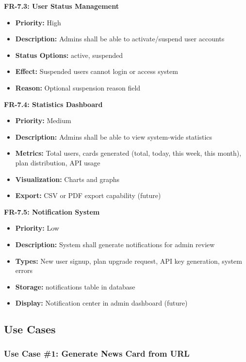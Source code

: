 \documentclass[12pt,a4paper]{article}
\begin{document}
\textbf{FR-7.3: User Status Management}
\begin{itemize}
    \item \textbf{Priority:} High
    \item \textbf{Description:} Admins shall be able to activate/suspend user accounts
    \item \textbf{Status Options:} active, suspended
    \item \textbf{Effect:} Suspended users cannot login or access system
    \item \textbf{Reason:} Optional suspension reason field
\end{itemize}

\textbf{FR-7.4: Statistics Dashboard}
\begin{itemize}
    \item \textbf{Priority:} Medium
    \item \textbf{Description:} Admins shall be able to view system-wide statistics
    \item \textbf{Metrics:} Total users, cards generated (total, today, this week, this month), plan distribution, API usage
    \item \textbf{Visualization:} Charts and graphs
    \item \textbf{Export:} CSV or PDF export capability (future)
\end{itemize}

\textbf{FR-7.5: Notification System}
\begin{itemize}
    \item \textbf{Priority:} Low
    \item \textbf{Description:} System shall generate notifications for admin review
    \item \textbf{Types:} New user signup, plan upgrade request, API key generation, system errors
    \item \textbf{Storage:} notifications table in database
    \item \textbf{Display:} Notification center in admin dashboard (future)
\end{itemize}

\subsection{Use Cases}

\subsubsection{Use Case \#1: Generate News Card from URL}
\end{document}
